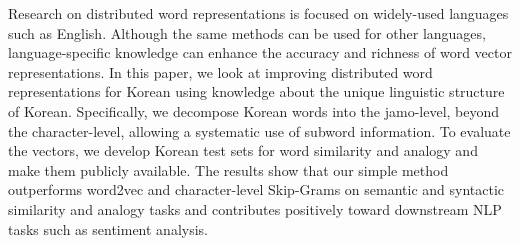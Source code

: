 Research on distributed word representations is focused on widely-used languages such as English. Although the same methods can be used for other languages, language-specific knowledge can enhance the accuracy and richness of word vector representations. In this paper, we look at improving distributed word representations for Korean using knowledge about the unique linguistic structure of Korean. Specifically, we decompose Korean words into the jamo-level, beyond the character-level, allowing a systematic use of subword information. To evaluate the vectors, we develop Korean test sets for word similarity and analogy and make them publicly available. The results show that our simple method outperforms word2vec and character-level Skip-Grams on semantic and syntactic similarity and analogy tasks and contributes positively toward downstream NLP tasks such as sentiment analysis.
